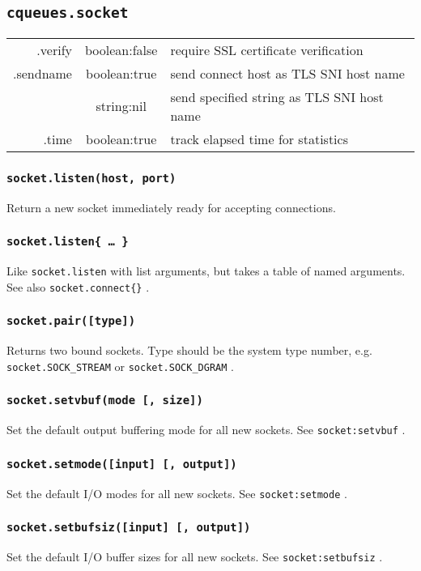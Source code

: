 \documentclass[11pt, oneside]{memoir}
\newcommand{\fn}[1]{\texttt{#1} }
\newcounter{toccols}
\newenvironment{Module}[1]{
	\subsection{\texttt{#1}}
	\addtocontents{toc}{
		\protect\begin{multicols}{\value{toccols}}
	}
}{
	\addtocontents{toc}{\protect\end{multicols}}
}
\begin{document}
\begin{Module}{cqueues.socket}
\begin{tabular}{r | c | p{4.5in}}
.verify & boolean:false & require SSL certificate verification \\

.sendname & boolean:true & send connect host as TLS SNI host name \\
          & string:nil & send specified string as TLS SNI host name \\

.time & boolean:true & track elapsed time for statistics \\
\end{tabular}

\subsubsection[\fn{socket.listen}]{\fn{socket.listen(host, port)}}
	Return a new socket immediately ready for accepting connections.

\subsubsection[\fn{socket.listen}]{\fn{socket.listen\{ … \}}}
	Like \fn{socket.listen} with list arguments, but takes a table of named arguments. See also \fn{socket.connect\{\}}.

\subsubsection[\fn{socket.pair}]{\fn{socket.pair([type])}}
Returns two bound sockets. Type should be the system type number, e.g. \fn{socket.SOCK\_STREAM} or \fn{socket.SOCK\_DGRAM}.

\subsubsection[\fn{socket.setvbuf}]{\fn{socket.setvbuf(mode [, size])}}
	Set the default output buffering mode for all new sockets. See \fn{socket:setvbuf}.

\subsubsection[\fn{socket.setmode}]{\fn{socket.setmode([input] [, output])}}
	Set the default I/O modes for all new sockets. See \fn{socket:setmode}.

\subsubsection[\fn{socket.setbufsiz}]{\fn{socket.setbufsiz([input] [, output])}}
	Set the default I/O buffer sizes for all new sockets. See \fn{socket:setbufsiz}.


\end{Module}
\end{document}
